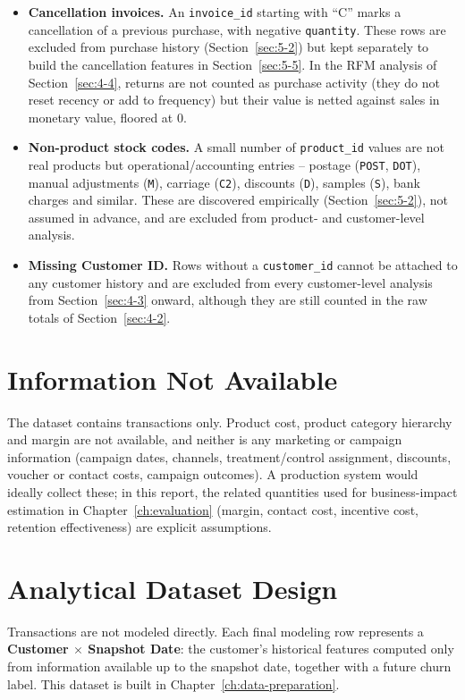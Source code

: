 \begin{itemize}
    \item \textbf{Cancellation invoices.} An \texttt{invoice\_id} starting with ``C'' marks a cancellation of a previous purchase, with negative \texttt{quantity}. These rows are excluded from purchase history (Section~\ref{sec:5-2}) but kept separately to build the cancellation features in Section~\ref{sec:5-5}. In the RFM analysis of Section~\ref{sec:4-4}, returns are not counted as purchase activity (they do not reset recency or add to frequency) but their value is netted against sales in monetary value, floored at 0.
    \item \textbf{Non-product stock codes.} A small number of \texttt{product\_id} values are not real products but operational/accounting entries -- postage (\texttt{POST}, \texttt{DOT}), manual adjustments (\texttt{M}), carriage (\texttt{C2}), discounts (\texttt{D}), samples (\texttt{S}), bank charges and similar. These are discovered empirically (Section~\ref{sec:5-2}), not assumed in advance, and are excluded from product- and customer-level analysis.
    \item \textbf{Missing Customer ID.} Rows without a \texttt{customer\_id} cannot be attached to any customer history and are excluded from every customer-level analysis from Section~\ref{sec:4-3} onward, although they are still counted in the raw totals of Section~\ref{sec:4-2}.
\end{itemize}

\section{Information Not Available}
\label{sec:3-6}

The dataset contains transactions only. Product cost, product category hierarchy and margin are not available, and neither is any marketing or campaign information (campaign dates, channels, treatment/control assignment, discounts, voucher or contact costs, campaign outcomes). A production system would ideally collect these; in this report, the related quantities used for business-impact estimation in Chapter~\ref{ch:evaluation} (margin, contact cost, incentive cost, retention effectiveness) are explicit assumptions.

\section{Analytical Dataset Design}
\label{sec:3-7}

Transactions are not modeled directly. Each final modeling row represents a \textbf{Customer $\times$ Snapshot Date}: the customer's historical features computed only from information available up to the snapshot date, together with a future churn label. This dataset is built in Chapter~\ref{ch:data-preparation}.
